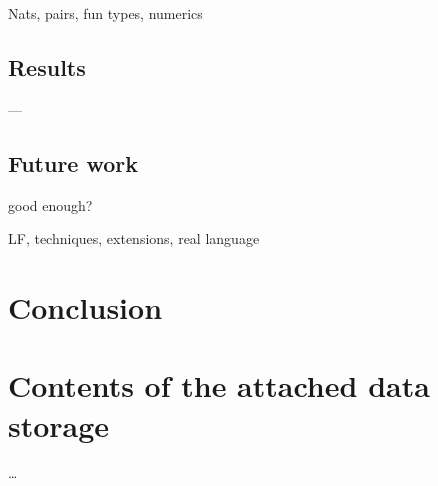 \documentclass[english,zadani,odsaz]{fitthesis}
\begin{document}
Nats, pairs, fun types, numerics

\section{Results}
\label{sec:orgea99192}
---

\section{Future work}
\label{sec:orgbec03ed}
good enough?

LF, techniques, extensions, real language

\chapter{Conclusion}
\label{sec:org7079550}





\makeatletter
\def\@openbib@code{\addcontentsline{toc}{chapter}{Bibliography}}
\makeatother
\begin{flushleft}




\end{flushleft}
\iftwoside\cleardoublepage\fi
\appendix
\appendixpage
\iftwoside\cleardoublepage\fi
\startcontents[chapters]
\iftwoside\cleardoublepage\fi

\chapter{Contents of the attached data storage}
\label{sec:org19b42c7}
\ldots{}
\end{document}
